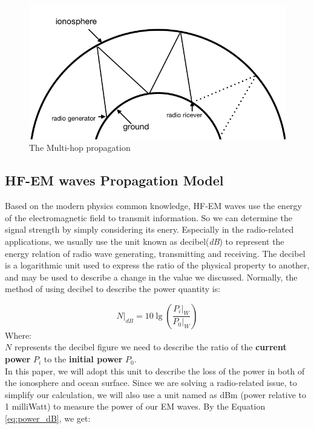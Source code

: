 \documentclass{mcmthesis}
\begin{document}
      \begin{figure}[h]
      \centering
      \includegraphics[scale=0.5]{Multi_hop}
      \caption{The Multi-hop propagation}
      \label{fig:Multi_hop}
      \end{figure}


  \subsection{HF-EM waves Propagation Model}

    Based on the modern physics common knowledge, HF-EM waves use the energy of the electromagnetic field to transmit information. So we can determine the signal strength by simply considering its enery. Especially in the radio-related applications, we usually use the unit known as decibel(\emph{dB}) to represent the energy relation of radio wave generating, transmitting and receiving. The decibel is a logarithmic unit used to express the ratio of the physical property to another, and may be used to describe a change in the value we discussed. Normally, the method of using decibel to describe the power quantity is:

      \begin{equation}\label{eq:power_dB}
        N|_{dB} = 10 \lg(\frac{P_{i}|_{W}}{P_{0}|_{W}})
      \end{equation}
      Where: \\
      $N$ represents the decibel figure we need to describe the ratio of the \textbf{current power} $P_{i}$ to the \textbf{initial power} $P_{0}$.\\

    In this paper, we will adopt this unit to describe the loss of the power in both of the ionosphere and ocean surface. Since we are solving a radio-related issue, to simplify our calculation, we will also use a unit named as dBm (power relative to 1 milliWatt) to measure the power of our EM waves. By the Equation \ref{eq:power_dB}, we get:
\end{document}
